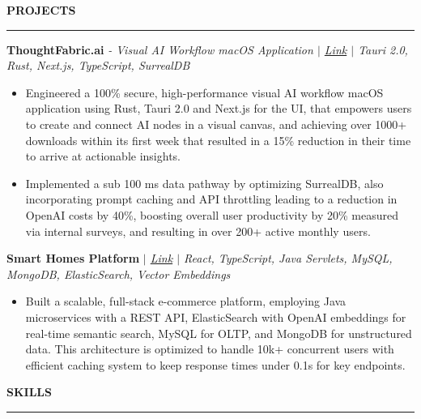 \documentclass[10pt,letterpaper]{article}
\begin{document}
\vspace{mm}
{\hspace{0in}\small\textbf{PROJECTS}}\par
\vspace{-2mm}
\noindent\rule{\textwidth}{0.1pt}
\vspace{-4mm}

\hspace{0in}\textbf{ThoughtFabric.ai}  \textit{- Visual AI Workflow macOS Application $|$ \href{https://thoughtfabric.ai}{Link} $|$ Tauri 2.0, Rust, Next.js, TypeScript, SurrealDB}
\begin{itemize}[leftmargin=0.15in,nosep,topsep=1pt,itemsep=0.5mm]
     \item Engineered a 100\% secure, high-performance visual AI workflow macOS application using Rust, Tauri 2.0 and Next.js for the UI, that empowers users to create and connect AI nodes in a visual canvas, and achieving over 1000+ downloads within its first week that resulted in a 15\% reduction in their time to arrive at actionable insights.   
     \item Implemented a sub 100 ms data pathway by optimizing SurrealDB, also incorporating prompt caching and API throttling leading to a reduction in OpenAI costs by 40\%, boosting overall user productivity by 20\% measured via internal surveys, and resulting in over 200+ active monthly users.
\end{itemize}

\hspace{0in}\textbf{Smart Homes Platform} \textit{$|$ \href{https://github.com/prajwal-svm/SmartHomes}{Link} $|$ React, TypeScript, Java Servlets, MySQL, MongoDB, ElasticSearch, Vector Embeddings}
\begin{itemize}[leftmargin=0.15in,nosep,topsep=1pt,itemsep=0.5mm]
  \item Built a scalable, full-stack e-commerce platform, employing Java microservices with a REST API, ElasticSearch with OpenAI embeddings for real-time semantic search, MySQL for OLTP, and MongoDB for unstructured data. This architecture is optimized to handle 10k+ concurrent users with efficient caching system to keep response times under 0.1s for key endpoints.
\end{itemize}

\vspace{2mm}
{\hspace{0in}\small\textbf{SKILLS}}\par
\vspace{-2mm}
\noindent\rule{\textwidth}{0.1pt}
\vspace{-4mm}
\end{document}
